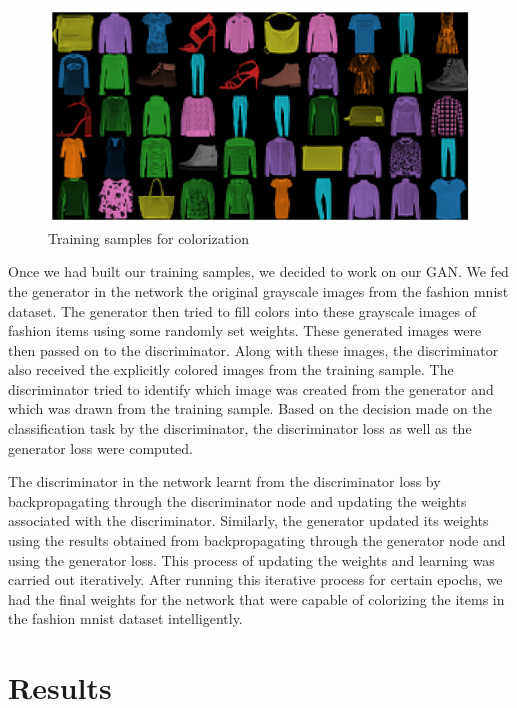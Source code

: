 \documentclass[conference]{IEEEtran}
\begin{document}
    
	\begin{figure}[!h]
	\begin{center}
	\caption{Training samples for colorization}
	\includegraphics[scale = 0.33]{Colorization_training_samples.png}
	\end{center}
	\end{figure}

	Once we had built our training samples, we decided to work on our GAN. We fed the generator in the network the original grayscale images from the fashion mnist dataset. The generator then tried to fill colors into these grayscale images of fashion items using some randomly set weights. These generated images were then passed on to the discriminator. Along with these images, the discriminator also received the explicitly colored images from the training sample. The discriminator tried to identify which image was created from the generator and which was drawn from the training sample. Based on the decision made on the classification task by the discriminator, the discriminator loss as well as the generator loss were computed. 

	The discriminator in the network learnt from the discriminator loss by backpropagating through the discriminator node and updating the weights associated with the discriminator. Similarly, the generator updated its weights using the results obtained from backpropagating through the generator node and using the generator loss. This process of updating the weights and learning was carried out iteratively. After running this iterative process for certain epochs, we had the final weights for the network that were capable of colorizing the items in the fashion mnist dataset intelligently. 

    \section{Results}\label{sec:results}
\end{document}
